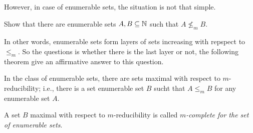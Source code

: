 However, in case of enumerable sets, the situation is not that simple.
\begin{exercise}
  Show that there are enumerable sets $A, B \subseteq {\mathbb{N}}$ such that $A \not\le_m
  B$.
\end{exercise}

In other words, enumerable sets form layers of sets increasing with repspect to
$\le_m$. So the questions is whether there is the last layer or not, the
following theorem give an affirmative answer to this question.
\begin{theorem}
  In the class of enumerable sets, there are sets maximal with respect to
  $m$-reducibility; i.e., there is a set enumerable set $B$ sucht that $A \le_m
  B$ for any enumerable set $A$.
\end{theorem}

\begin{definition}
  A set $B$ maximal with respect to $m$-reducibility is called
  \emph{$m$-complete for the set of enumerable sets}.
\end{definition}
